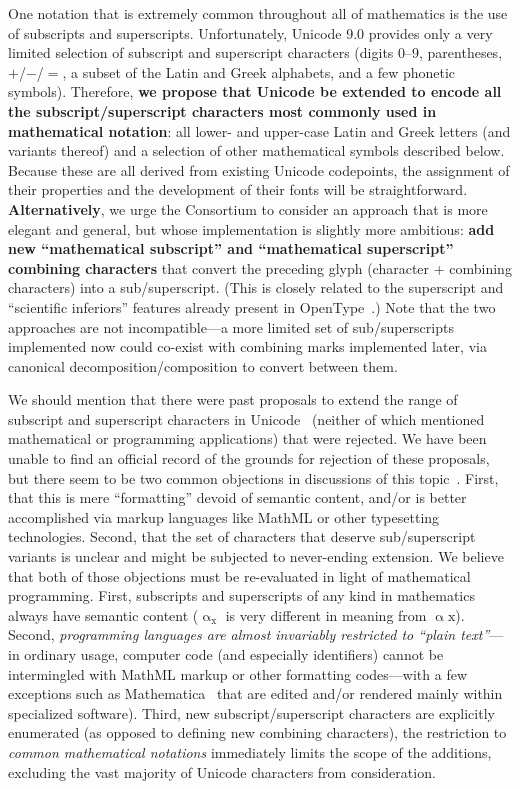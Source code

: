 \documentclass[10pt,english]{article}
\begin{document}
One notation that is extremely common throughout all of mathematics
is the use of subscripts and superscripts. Unfortunately, Unicode
9.0 provides only a very limited selection of subscript and superscript
characters (digits 0--9, parentheses, $+$/$-$/$=$, a subset of
the Latin and Greek alphabets, and a few phonetic symbols). Therefore,\textbf{
we propose that Unicode be extended to encode all the subscript/superscript
characters most commonly used in mathematical notation}: all lower-
and upper-case Latin and Greek letters (and variants thereof) and
a selection of other mathematical symbols described below. Because
these are all derived from existing Unicode codepoints, the assignment
of their properties and the development of their fonts will be straightforward.
\textbf{Alternatively}, we urge the Consortium to consider an approach
that is more elegant and general, but whose implementation is slightly
more ambitious: \textbf{add new ``mathematical subscript'' and ``mathematical
superscript'' combining characters} that convert the preceding glyph
(character + combining characters) into a sub/superscript. (This is
closely related to the superscript and ``scientific
inferiors'' features already present in OpenType~\cite{OpenType}.)
Note that the two approaches are not incompatible---a more limited
set of sub/superscripts implemented now could co-exist with combining
marks implemented later, via canonical decomposition/composition to
convert between them.

We should mention that there were past proposals to extend the range
of subscript and superscript characters in Unicode~\cite{L2-10-230,L2-11-208}
(neither of which mentioned mathematical or programming applications)
that were rejected. We have been unable to find an official record
of the grounds for rejection of these proposals, but there seem to
be two common objections in discussions of this topic~\cite{Miller10,UCDF}.
First, that this is mere ``formatting''
devoid of semantic content, and/or is better accomplished via markup
languages like MathML or other typesetting technologies. Second, that
the set of characters that deserve sub/superscript variants is unclear
and might be subjected to never-ending extension. We believe that
both of those objections must be re-evaluated in light of mathematical
programming. First, subscripts and superscripts of any kind in mathematics
always have semantic content ($\mathrm{{\upalpha_{x}}}$ is very different
in meaning from $\mathrm{\upalpha\mathrm{{x}}}$). Second, \emph{programming
languages are almost invariably restricted to ``plain text''}---in
ordinary usage, computer code (and especially identifiers) cannot
be intermingled with MathML markup or other formatting codes---with
a few exceptions such as Mathematica~\cite{Mathematica} that are
edited and/or rendered mainly within specialized software). Third,
new subscript/superscript characters are explicitly enumerated (as
opposed to defining new combining characters), the restriction to
\emph{common mathematical notations} immediately limits the scope
of the additions, excluding the vast majority of Unicode characters
from consideration.
\end{document}
